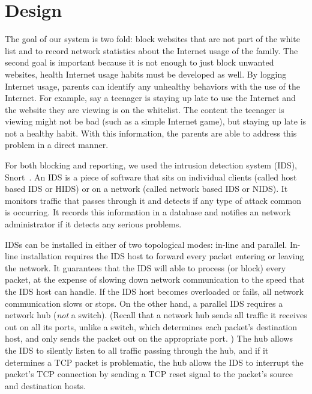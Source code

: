 
\section{Design}

The goal of our system is two fold: block websites that are not part of the
white list and to record network statistics about the Internet usage of the
family. The second goal is important because it is not enough to just block
unwanted websites, health Internet usage habits must be developed as well. By
logging Internet usage, parents can identify any unhealthy behaviors with the
use of the Internet. For example, say a teenager is staying up late to use the
Internet and the website they are viewing is on the whitelist. The content the
teenager is viewing might not be bad (such as a simple Internet game), but
staying up late is not a healthy habit. With this information, the parents are
able to address this problem in a direct manner.

For both blocking and reporting, we used the intrusion detection system (IDS),
Snort~\cite{snort}. An IDS is a piece of software that sits on individual
clients (called host based IDS or HIDS) or on a network (called network based
IDS or NIDS). It monitors traffic that passes through it and detects if any
type of attack common is occurring. It records this information in a database
and notifies an network administrator if it detects any serious problems.

IDSs can be installed in either of two topological modes: in-line and
parallel.  
% 
In-line installation requires the IDS host to forward every packet entering or
leaving the network.  
%
It guarantees that the IDS will able to process (or block) every packet, at
the expense of slowing down network communication to the speed that the IDS
host can handle.  
%
If the IDS host becomes overloaded or fails, all network communication slows
or stops.  
%
On the other hand, a parallel IDS requires a network hub (\emph{not} a
switch).  
%
(Recall that a network hub sends all traffic it receives out on all its ports,
unlike a switch, which determines each packet's destination host, and only
sends the packet out on the appropriate port. ) 
%
The hub allows the IDS to silently listen to all traffic passing through the
hub, and if it determines a TCP packet is problematic, the hub allows the IDS
to interrupt the packet's TCP connection by sending a TCP reset signal to the
packet's source and destination hosts.

